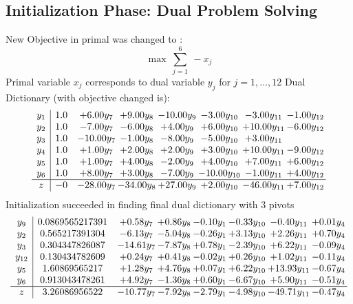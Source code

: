 \documentclass[8pt]{article}
\begin{document}
\subsection{Initialization Phase: Dual Problem Solving}
New Objective in primal was changed to : \[ \max\ \sum_{j=1}^{6}\ - x_j \] 
Primal variable $x_j$ corresponds to dual variable $y_j$ for $j = 1,\ldots,12$
Dual Dictionary (with objective changed is): 
\[\begin{array}{c| c c@{\hskip 2pt} c@{\hskip 2pt} c@{\hskip 2pt} c@{\hskip 2pt} c@{\hskip 2pt} c@{\hskip 2pt} }
 y_{1}   &  1.0 & +  6.00 y_{7} & +  9.00 y_{8} & -10.00 y_{9} & -3.00 y_{10} & -3.00 y_{11} & -1.00 y_{12}\\
 y_{2}   &  1.0 & -7.00 y_{7} & -6.00 y_{8} & +  4.00 y_{9} & +  6.00 y_{10} & + 10.00 y_{11} & -6.00 y_{12}\\
 y_{3}   &  1.0 & -10.00 y_{7} & -1.00 y_{8} & -8.00 y_{9} & -5.00 y_{10} & +  3.00 y_{11} &   \\
 y_{4}   &  1.0 & +  1.00 y_{7} & +  2.00 y_{8} & +  2.00 y_{9} & +  3.00 y_{10} & + 10.00 y_{11} & -9.00 y_{12}\\
 y_{5}   &  1.0 & +  1.00 y_{7} & +  4.00 y_{8} & -2.00 y_{9} & +  4.00 y_{10} & +  7.00 y_{11} & +  6.00 y_{12}\\
 y_{6}   &  1.0 & +  8.00 y_{7} & +  3.00 y_{8} & -7.00 y_{9} & -10.00 y_{10} & -1.00 y_{11} & +  4.00 y_{12}\\
\hline
z    &  -0 & -28.00 y_{7} & -34.00 y_{8} & + 27.00 y_{9} & +  2.00 y_{10} & -46.00 y_{11} & +  7.00 y_{12}\\
\end{array}\]
Initialization succeeded in finding final dual dictionary with 3 pivots
\[\begin{array}{c| c c@{\hskip 2pt} c@{\hskip 2pt} c@{\hskip 2pt} c@{\hskip 2pt} c@{\hskip 2pt} c@{\hskip 2pt} }
 y_{9}   &  0.0869565217391 & +  0.58 y_{7} & +  0.86 y_{8} & -0.10 y_{1} & -0.33 y_{10} & -0.40 y_{11} & +  0.01 y_{4}\\
 y_{2}   &  0.565217391304 & -6.13 y_{7} & -5.04 y_{8} & -0.26 y_{1} & +  3.13 y_{10} & +  2.26 y_{11} & +  0.70 y_{4}\\
 y_{3}   &  0.304347826087 & -14.61 y_{7} & -7.87 y_{8} & +  0.78 y_{1} & -2.39 y_{10} & +  6.22 y_{11} & -0.09 y_{4}\\
 y_{12}   &  0.130434782609 & +  0.24 y_{7} & +  0.41 y_{8} & -0.02 y_{1} & +  0.26 y_{10} & +  1.02 y_{11} & -0.11 y_{4}\\
 y_{5}   &  1.60869565217 & +  1.28 y_{7} & +  4.76 y_{8} & +  0.07 y_{1} & +  6.22 y_{10} & + 13.93 y_{11} & -0.67 y_{4}\\
 y_{6}   &  0.913043478261 & +  4.92 y_{7} & -1.36 y_{8} & +  0.60 y_{1} & -6.67 y_{10} & +  5.90 y_{11} & -0.51 y_{4}\\
\hline
z    &  3.26086956522 & -10.77 y_{7} & -7.92 y_{8} & -2.79 y_{1} & -4.98 y_{10} & -49.71 y_{11} & -0.47 y_{4}\\
\end{array}\]
\end{document}
